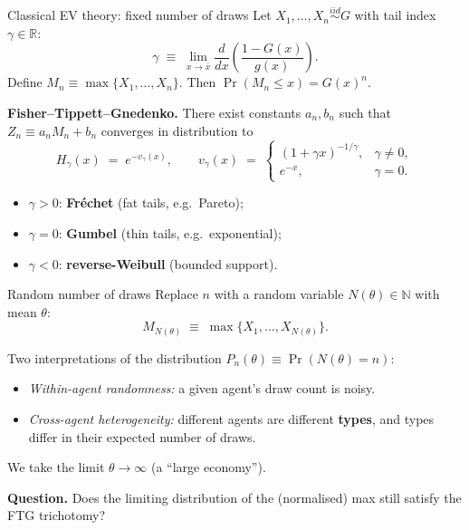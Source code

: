 \documentclass[aspectratio=169,xcolor=dvipsnames]{beamer}
\begin{document}
\begin{frame}{Classical EV theory: fixed number of draws}
    Let $X_1,\dots,X_n \overset{iid}{\sim} G$ with tail index $\gamma\in\mathbb{R}$:
    \[
        \gamma \;\equiv\; \lim_{x\to\overline{x}} \frac{d}{dx}\!\left(\frac{1-G(x)}{g(x)}\right).
    \]
    Define $M_n \equiv \max\{X_1,\dots,X_n\}$. Then $\Pr(M_n\le x)=G(x)^n$.

    \vspace{2mm}
    \textbf{Fisher--Tippett--Gnedenko.} There exist constants $a_n, b_n$ such that $Z_n \equiv a_n M_n + b_n$ converges in distribution to
    \[
        H_\gamma(x) \;=\; e^{-v_\gamma(x)},\qquad
        v_\gamma(x) \;=\;
        \begin{cases}
            (1+\gamma x)^{-1/\gamma}, & \gamma\ne 0,\\
            e^{-x}, & \gamma=0.
        \end{cases}
    \]
    \begin{itemize}
        \item $\gamma>0$: \textbf{Fr\'echet} (fat tails, e.g.\ Pareto);
        \item $\gamma=0$: \textbf{Gumbel} (thin tails, e.g.\ exponential);
        \item $\gamma<0$: \textbf{reverse-Weibull} (bounded support).
    \end{itemize}
\end{frame}

\begin{frame}{Random number of draws}
    Replace $n$ with a random variable $N(\theta)\in\mathbb{N}$ with mean $\theta$:
    \[
        M_{N(\theta)} \;\equiv\; \max\{X_1,\dots,X_{N(\theta)}\}.
    \]
    \vspace{1mm}

    Two interpretations of the distribution $P_n(\theta) \equiv \Pr(N(\theta)=n)$:
    \begin{itemize}
        \item \emph{Within-agent randomness:} a given agent's draw count is noisy.
        \item \emph{Cross-agent heterogeneity:} different agents are different \textbf{types}, and types differ in their expected number of draws.
    \end{itemize}

    \vspace{3mm}
    We take the limit $\theta\to\infty$ (a ``large economy'').

    \vspace{2mm}
    \textbf{Question.} Does the limiting distribution of the (normalised) max still satisfy the FTG trichotomy?
\end{frame}
\end{document}

